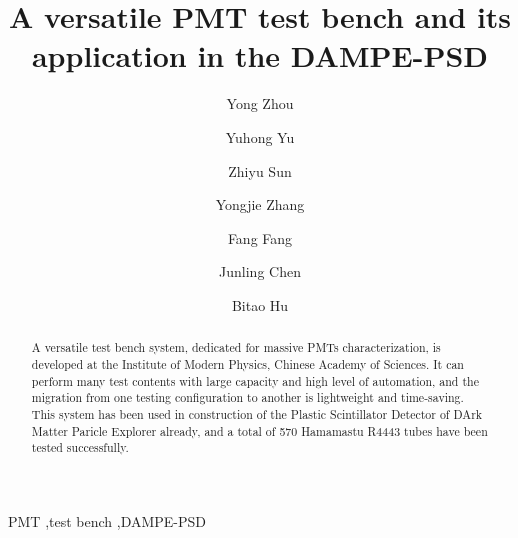 \documentclass[review, times]{elsarticle}
\begin{document}
\begin{frontmatter}

\title{A versatile PMT test bench and its application in the DAMPE-PSD}

\author[imp,lzu,ucas]{Yong Zhou}

\author[imp]{Yuhong Yu}

\author[imp]{Zhiyu Sun}

\author[imp]{Yongjie Zhang}
\author[imp]{Fang Fang}
\author[imp]{Junling Chen}

\author[lzu]{Bitao Hu}

\address[imp]{Institute of Modern Physicas, Chinese Academy of Sciences,  509 Nanchang Road,  Lanzhou,  730000,  P.R.China}
\address[lzu]{School of Nuclear Science and Technology,  Lanzhou University,  222 South Tianshui Road,  Lanzhou,  730000,  P.R.China}
\address[ucas]{Graduate University of the Chinese Academy of Sciences,  19A Yuquan Road,  Beijing,  100049,  P.R.China}

\begin{abstract}

A versatile test bench system, dedicated for massive PMTs characterization, is developed at the Institute of Modern Physics, Chinese Academy of Sciences. 
It can perform many test contents with large capacity and high level of automation, and the migration from one testing configuration to another is lightweight and time-saving. 
This system has been used in construction of the Plastic Scintillator Detector of DArk Matter Paricle Explorer already, and a total of 570 Hamamastu R4443 tubes have been tested successfully.
\end{abstract}

\begin{keyword}
PMT
\sep test bench
\sep DAMPE-PSD



\end{keyword}

\end{frontmatter}
\linenumbers
\end{document}
